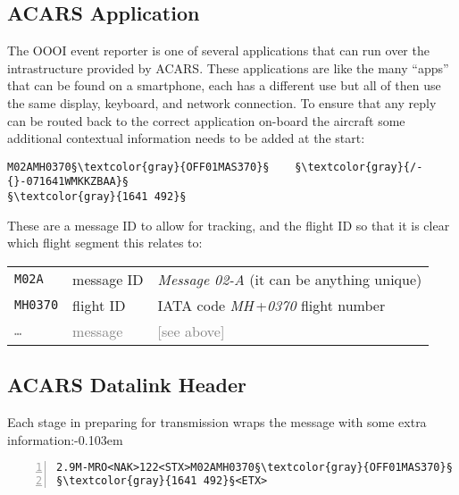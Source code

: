 \documentclass[tikz,a4paper,12pt]{article}
\begin{document}
\subsection{ACARS Application}

The \gls{OOOI} event reporter is one of several applications that can run
over the intrastructure provided by \gls{ACARS}.  These applications are
like the many ``apps'' that can be found on a smartphone, each has a
different use but all of then use the same display, keyboard, and network
connection. To ensure that any reply can be routed back to the correct
application on-board the aircraft some additional contextual information needs to be added at the
start:

\begin{lstlisting}[language=ACARS,linewidth=\textwidth]
M02AMH0370§\textcolor{gray}{OFF01MAS370}§    §\textcolor{gray}{/-{}-071641WMKKZBAA}§
§\textcolor{gray}{1641 492}§
\end{lstlisting}

These are a message ID to allow for tracking, and the flight ID so
that it is clear which flight segment this relates to:

\begin{center}
\begin{tabular}{p{1.5cm}p{2cm}p{8cm}}
\hfill\texttt{M02A}&message ID&\emph{Message 02-A} (it can be anything unique)\\
\hfill\texttt{MH0370}&flight ID&\acrshort{IATA} code \emph{MH}\,+\emph{0370} flight number\\
\hline
\hfill\textcolor{gray}{\texttt{\ldots}}&\textcolor{gray}{message}&\textcolor{gray}{[see above]}\\
\end{tabular}
\end{center}

\newpage
\subsection{ACARS Datalink Header}

{Each stage in preparing for transmission wraps the message with some extra information:\unskip\parfillskip-0.103em \par}

\begin{lstlisting}[language=ACARS,numbers=left,linewidth=\textwidth]
2.9M-MRO<NAK>122<STX>M02AMH0370§\textcolor{gray}{OFF01MAS370}§    §\textcolor{gray}{/-{}-071641WMKKZBAA}§\r\n
§\textcolor{gray}{1641 492}§<ETX>
\end{lstlisting}
\end{document}
